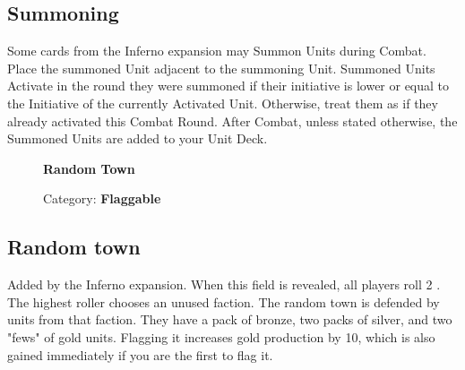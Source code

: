 \subsection*{Summoning}
Some cards from the Inferno expansion may Summon Units during Combat.
Place the summoned Unit adjacent to the summoning Unit.
Summoned Units Activate in the round they were summoned if their initiative is lower or equal to the Initiative of the currently Activated Unit.
Otherwise, treat them as if they already activated this Combat Round.
After Combat, unless stated otherwise, the Summoned Units are added to your Unit Deck.

\begin{wrapfigure}{r}{0.5\textwidth}
  \begin{center}
    \textbf{Random Town}\medskip
    \caption{\scriptsize Category: \scriptsize\textbf{Flaggable}}
  \end{center}
\end{wrapfigure}
\subsection*{Random town}
Added by the Inferno expansion.
When this field is revealed, all players roll 2 .
The highest roller chooses an unused faction.
The random town is defended by units from that faction.
They have a pack of bronze, two packs of silver, and two "fews" of gold units.
Flagging it increases gold production by 10, which is also gained immediately if you are the first to flag it.
